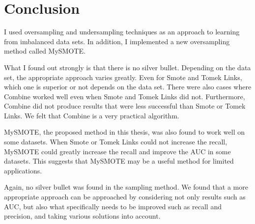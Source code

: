\chapter{Conclusion}

I used oversampling and undersampling techniques as an approach to learning from imbalanced data sets. In addition, I implemented a new oversampling method called MySMOTE.

What I found out strongly is that there is no silver bullet. Depending on the data set, the appropriate approach varies greatly. Even for Smote and Tomek Links, which one is superior or not depends on the data set. There were also cases where Combine worked well even when Smote and Tomek Links did not. Furthermore, Combine did not produce results that were less successful than Smote or Tomek Links. We felt that Combine is a very practical algorithm. 

MySMOTE, the proposed method in this thesis, was also found to work well on some datasets. When Smote or Tomek Links could not increase the recall, MySMOTE could greatly increase the recall and improve the AUC in some datasets. This suggests that MySMOTE may be a useful method for limited applications. 

Again, no silver bullet was found in the sampling method. We found that a more appropriate approach can be approached by considering not only results such as AUC, but also what specifically needs to be improved such as recall and precision, and taking various solutions into account.
